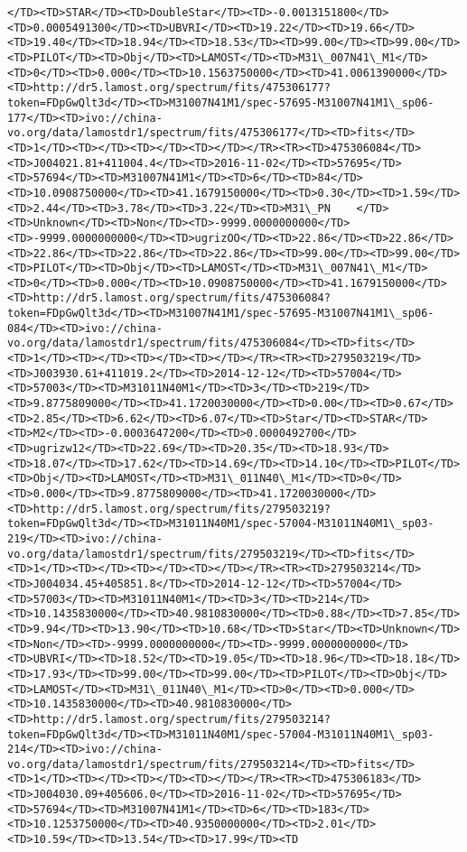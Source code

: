 \documentclass[11pt]{article}
\begin{document}
\begin{Verbatim}[commandchars=\\\{\}]
</TD><TD>STAR</TD><TD>DoubleStar</TD><TD>-0.0013151800</TD><TD>0.0005491300</TD><TD>UBVRI</TD><TD>19.22</TD><TD>19.66</TD><TD>19.40</TD><TD>18.94</TD><TD>18.53</TD><TD>99.00</TD><TD>99.00</TD><TD>PILOT</TD><TD>Obj</TD><TD>LAMOST</TD><TD>M31\_007N41\_M1</TD><TD>0</TD><TD>0.000</TD><TD>10.1563750000</TD><TD>41.0061390000</TD><TD>http://dr5.lamost.org/spectrum/fits/475306177?token=FDpGwQlt3d</TD><TD>M31007N41M1/spec-57695-M31007N41M1\_sp06-177</TD><TD>ivo://china-vo.org/data/lamostdr1/spectrum/fits/475306177</TD><TD>fits</TD><TD>1</TD><TD></TD><TD></TD><TD></TD></TR><TR><TD>475306084</TD><TD>J004021.81+411004.4</TD><TD>2016-11-02</TD><TD>57695</TD><TD>57694</TD><TD>M31007N41M1</TD><TD>6</TD><TD>84</TD><TD>10.0908750000</TD><TD>41.1679150000</TD><TD>0.30</TD><TD>1.59</TD><TD>2.44</TD><TD>3.78</TD><TD>3.22</TD><TD>M31\_PN    </TD><TD>Unknown</TD><TD>Non</TD><TD>-9999.0000000000</TD><TD>-9999.0000000000</TD><TD>ugrizOO</TD><TD>22.86</TD><TD>22.86</TD><TD>22.86</TD><TD>22.86</TD><TD>22.86</TD><TD>99.00</TD><TD>99.00</TD><TD>PILOT</TD><TD>Obj</TD><TD>LAMOST</TD><TD>M31\_007N41\_M1</TD><TD>0</TD><TD>0.000</TD><TD>10.0908750000</TD><TD>41.1679150000</TD><TD>http://dr5.lamost.org/spectrum/fits/475306084?token=FDpGwQlt3d</TD><TD>M31007N41M1/spec-57695-M31007N41M1\_sp06-084</TD><TD>ivo://china-vo.org/data/lamostdr1/spectrum/fits/475306084</TD><TD>fits</TD><TD>1</TD><TD></TD><TD></TD><TD></TD></TR><TR><TD>279503219</TD><TD>J003930.61+411019.2</TD><TD>2014-12-12</TD><TD>57004</TD><TD>57003</TD><TD>M31011N40M1</TD><TD>3</TD><TD>219</TD><TD>9.8775809000</TD><TD>41.1720030000</TD><TD>0.00</TD><TD>0.67</TD><TD>2.85</TD><TD>6.62</TD><TD>6.07</TD><TD>Star</TD><TD>STAR</TD><TD>M2</TD><TD>-0.0003647200</TD><TD>0.0000492700</TD><TD>ugrizw12</TD><TD>22.69</TD><TD>20.35</TD><TD>18.93</TD><TD>18.07</TD><TD>17.62</TD><TD>14.69</TD><TD>14.10</TD><TD>PILOT</TD><TD>Obj</TD><TD>LAMOST</TD><TD>M31\_011N40\_M1</TD><TD>0</TD><TD>0.000</TD><TD>9.8775809000</TD><TD>41.1720030000</TD><TD>http://dr5.lamost.org/spectrum/fits/279503219?token=FDpGwQlt3d</TD><TD>M31011N40M1/spec-57004-M31011N40M1\_sp03-219</TD><TD>ivo://china-vo.org/data/lamostdr1/spectrum/fits/279503219</TD><TD>fits</TD><TD>1</TD><TD></TD><TD></TD><TD></TD></TR><TR><TD>279503214</TD><TD>J004034.45+405851.8</TD><TD>2014-12-12</TD><TD>57004</TD><TD>57003</TD><TD>M31011N40M1</TD><TD>3</TD><TD>214</TD><TD>10.1435830000</TD><TD>40.9810830000</TD><TD>0.88</TD><TD>7.85</TD><TD>9.94</TD><TD>13.90</TD><TD>10.68</TD><TD>Star</TD><TD>Unknown</TD><TD>Non</TD><TD>-9999.0000000000</TD><TD>-9999.0000000000</TD><TD>UBVRI</TD><TD>18.52</TD><TD>19.05</TD><TD>18.96</TD><TD>18.18</TD><TD>17.93</TD><TD>99.00</TD><TD>99.00</TD><TD>PILOT</TD><TD>Obj</TD><TD>LAMOST</TD><TD>M31\_011N40\_M1</TD><TD>0</TD><TD>0.000</TD><TD>10.1435830000</TD><TD>40.9810830000</TD><TD>http://dr5.lamost.org/spectrum/fits/279503214?token=FDpGwQlt3d</TD><TD>M31011N40M1/spec-57004-M31011N40M1\_sp03-214</TD><TD>ivo://china-vo.org/data/lamostdr1/spectrum/fits/279503214</TD><TD>fits</TD><TD>1</TD><TD></TD><TD></TD><TD></TD></TR><TR><TD>475306183</TD><TD>J004030.09+405606.0</TD><TD>2016-11-02</TD><TD>57695</TD><TD>57694</TD><TD>M31007N41M1</TD><TD>6</TD><TD>183</TD><TD>10.1253750000</TD><TD>40.9350000000</TD><TD>2.01</TD><TD>10.59</TD><TD>13.54</TD><TD>17.99</TD><TD
\end{Verbatim}
\end{document}
